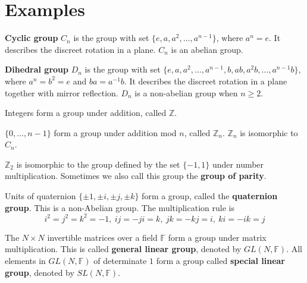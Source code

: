 \documentclass[12pt]{book}
\begin{document}
\section{Examples}
\begin{example}
	\textbf{Cyclic group} $C_n$ is the group with set $\{e,a,a^2,\dots,a^{n-1}\}$, where $a^n=e$. It describes the discreet rotation in a plane. $C_n$ is an abelian group.
\end{example}
	
\begin{example}
	\textbf{Dihedral group} $D_n$ is the group with set $\{e,a,a^2,\dots,a^{n-1},b,ab,a^2b,\dots,a^{n-1}b\}$, where $a^n=b^2=e$ and $ba=a^{-1}b$. It describes the discreet rotation in a plane together with mirror reflection. $D_n$ is a non-abelian group when $n\geq 2$.
\end{example}
	
\begin{example}
	Integers form a group under addition, called $\mathbb Z$.
\end{example}
	
\begin{example}
	$\{0,\dots,n-1\}$ form a group under addition mod $n$, called $\mathbb Z_n$. $\mathbb Z_n$ is isomorphic to $C_n$.
\end{example}
	
\begin{example}
	$\mathbb Z_2$ is isomorphic to the group defined by the set $\{-1,1\}$ under number multiplication. Sometimes we also call this group the \textbf{group of parity}.
\end{example}
	
\begin{example}
	Units of quaternion $\{\pm1,\pm i,\pm j,\pm k\}$ form a group, called the \textbf{quaternion group}. This is a non-Abelian group. The multiplication rule is
	\begin{equation}
		i^2=j^2=k^2=-1,\ ij=-ji=k,\ jk=-kj=i,\ ki=-ik=j
	\end{equation}
\end{example}
	
\begin{example}
	The $N\times N$ invertible matrices over a field $\mathbb F$ form a group under matrix multiplication. This is called \textbf{general linear group}, denoted by $GL(N,\mathbb F)$. All elements in $GL(N,\mathbb F)$ of determinate $1$ form a group called \textbf{special linear group}, denoted by $SL(N,\mathbb F)$.
\end{example}
	
\end{document}
